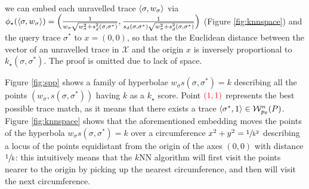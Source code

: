  we can embed each unravelled trace $\braket{\sigma,w_\sigma}$ via $\phi_\star(\braket{\sigma,w_\sigma})=\Big(\frac{1}{w_\sigma\sqrt{w_\sigma^2+s_d^2(\sigma,\sigma^*)}},\frac{1}{s_d(\sigma,\sigma^*)\sqrt{w_\sigma^2+s_d^2(\sigma,\sigma^*)}}\Big)$ (Figure \ref{fig:knnspace}) and the query trace $\sigma^*$ to $x=(0,0)$, so that the the Euclidean distance between the vector of an unravelled trace in $\mathcal{X}$ and the origin $x$ is  inversely proportional to $k_\star(\sigma,\sigma^*)$. The proof is omitted due to lack of space. 
 
\begin{example}
	Figure \ref{fig:spp} shows a family of hyperbolae $w_\sigma s(\sigma,\sigma^*)=k$ describing all the points $(w_\sigma, s(\sigma,\sigma^*))$ having $k$ as a $k_\star$ score. Point $\color{red}(1,1)$ represents the best possible trace match, as it means that there exists a trace $\braket{\sigma^*,1}\in\mathcal{W}_{p_\theta}^n(P)$.
		Figure \ref{fig:knnspace} shows that the aforementioned embedding moves the points of the hyperbola $w_\sigma s(\sigma,\sigma^*)=k$ over a circumference $x^2+y^2=\sfrac{1}{k^2}$ describing a locus of the points equidistant from the origin of the axes $(0,0)$ with distance $\sfrac{1}{k}$: this intuitively means that the $k$NN algorithm will first visit the points nearer to the origin by picking up the nearest circumference, and then will visit the next circumference.
\end{example}

